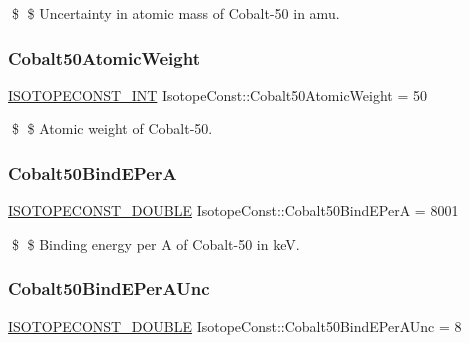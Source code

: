 \$ \$ Uncertainty in atomic mass of Cobalt-\/50 in amu. \mbox{\label{group___isotope_const-_cobalt-_co50_ga56063e1cb6dfac265b00c0deef77ce33}} 
\subsubsection{\texorpdfstring{Cobalt50\+Atomic\+Weight}{Cobalt50AtomicWeight}}
{\footnotesize\ttfamily \mbox{\hyperlink{group___isotope_const-_macros_ga5f18360b3e99483a35c32d789e62621c}{I\+S\+O\+T\+O\+P\+E\+C\+O\+N\+S\+T\+\_\+\+I\+NT}} Isotope\+Const\+::\+Cobalt50\+Atomic\+Weight = 50}

\$ \$ Atomic weight of Cobalt-\/50. \mbox{\label{group___isotope_const-_cobalt-_co50_gaefff15e8a729765109850b7ee546f4af}} 
\subsubsection{\texorpdfstring{Cobalt50\+Bind\+E\+PerA}{Cobalt50BindEPerA}}
{\footnotesize\ttfamily \mbox{\hyperlink{group___isotope_const-_macros_ga8f45a7272ce02c0b4c65c44636ed719a}{I\+S\+O\+T\+O\+P\+E\+C\+O\+N\+S\+T\+\_\+\+D\+O\+U\+B\+LE}} Isotope\+Const\+::\+Cobalt50\+Bind\+E\+PerA = 8001}

\$ \$ Binding energy per A of Cobalt-\/50 in keV. \mbox{\label{group___isotope_const-_cobalt-_co50_ga076adb0be89d599aaa6d010f9b1ab5f6}} 
\subsubsection{\texorpdfstring{Cobalt50\+Bind\+E\+Per\+A\+Unc}{Cobalt50BindEPerAUnc}}
{\footnotesize\ttfamily \mbox{\hyperlink{group___isotope_const-_macros_ga8f45a7272ce02c0b4c65c44636ed719a}{I\+S\+O\+T\+O\+P\+E\+C\+O\+N\+S\+T\+\_\+\+D\+O\+U\+B\+LE}} Isotope\+Const\+::\+Cobalt50\+Bind\+E\+Per\+A\+Unc = 8}

